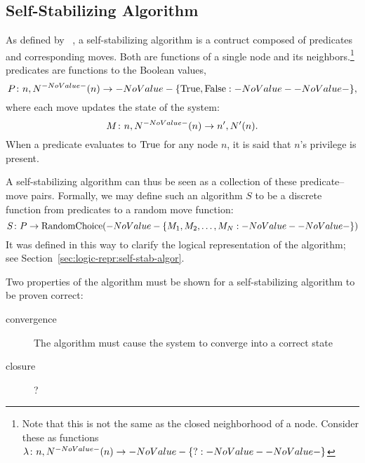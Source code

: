 \subsection{Self-Stabilizing Algorithm}
\label{sec:math-define:self-stab-algor}

As defined by \citeauthor{Dijkstra:1974:SSS:361179.361202}~\autocite{Dijkstra:1974:SSS:361179.361202},
  \done
  a self-stabilizing algorithm is a contruct composed of
  \glspl{predicate} and corresponding \glspl{move}.
Both are functions of a single node and its neighbors.\footnote{%
  Note that this is not the same as the closed neighborhood of a node.
  Consider these as functions $\Function{n, \OpenNeighborhood{n}}{\Set ?}$}
\Glspl{predicate} are functions to the Boolean values,
  \begin{equation}
  \label{eq:define-predicate}
  \Function[P]{n, \OpenNeighborhood{n}}{\SetBoolean},
  \end{equation}
  where each \gls{move} updates the state of the system:
  \begin{equation}
  \label{eq:define-move}
  \Function[M]{n, \OpenNeighborhood{n}}{n^\prime, \OpenNeighborhood[\prime]{n}}.
  \end{equation}
When a \gls{predicate} evaluates to $\text{True}$ for any node $n$,
  it is said that $n$'s \gls{privilege} is \gls{present}.

A self-stabilizing algorithm can thus be seen as
  a collection of these \gls{predicate}--\gls{move} pairs.
Formally, we may define such an algorithm $S$ to be a discrete function
  from \glspl{predicate} to a random \gls{move} function:
  \begin{equation}
    \label{eq:define-ssalg}
    \Function[S]{P}{\operatorname{RandomChoice}(\Set{M_1, M_2, \dots, M_N})}
  \end{equation}
It was defined in this way to clarify the logical representation of the algorithm;
  see Section~\ref{sec:logic-repr:self-stab-algor}.

Two properties of the algorithm must be shown
  for a self-stabilizing algorithm to be proven correct:~\autocite{arora:closure-and-convergence}
\begin{description}
\item[convergence] The algorithm must cause the system to converge into a correct state
\item[closure] ? 
\end{description}

